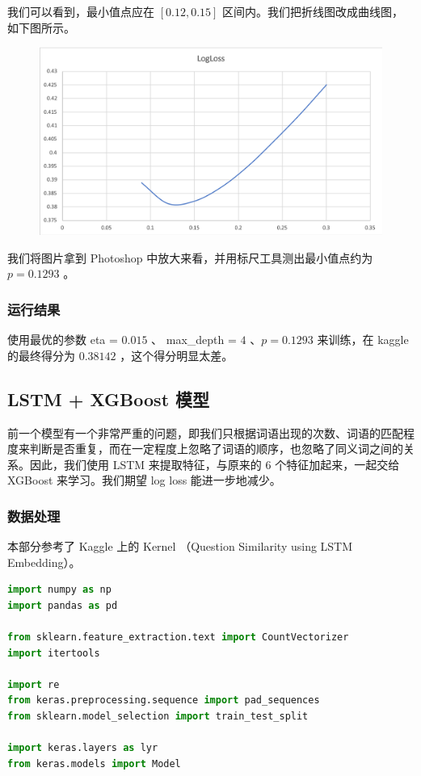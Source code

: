 \documentclass{article}
\begin{document}
我们可以看到，最小值点应在 $[0.12, 0.15]$ 区间内。我们把折线图改成曲线图，如下图所示。

\begin{figure}[!h]
\centering
\includegraphics[scale=0.5]{tu5-1.png}
\end{figure}

我们将图片拿到 Photoshop 中放大来看，并用标尺工具测出最小值点约为 $p = 0.1293$ 。

\subsubsection{运行结果}

使用最优的参数 eta = $0.015$ 、 max\_depth = $4$ 、$p = 0.1293$ 来训练，在 kaggle 的最终得分为 $0.38142$ ，这个得分明显太差。

\subsection{LSTM + XGBoost 模型}

前一个模型有一个非常严重的问题，即我们只根据词语出现的次数、词语的匹配程度来判断是否重复，而在一定程度上忽略了词语的顺序，也忽略了同义词之间的关系。因此，我们使用 LSTM 来提取特征，与原来的 $6$ 个特征加起来，一起交给 XGBoost 来学习。我们期望 log loss 能进一步地减少。

\subsubsection{数据处理}

本部分参考了 Kaggle 上的 Kernel （Question Similarity using LSTM Embedding）。

\begin{lstlisting}[language=python]
import numpy as np
import pandas as pd

from sklearn.feature_extraction.text import CountVectorizer
import itertools

import re
from keras.preprocessing.sequence import pad_sequences
from sklearn.model_selection import train_test_split

import keras.layers as lyr
from keras.models import Model
\end{lstlisting}
\end{document}
